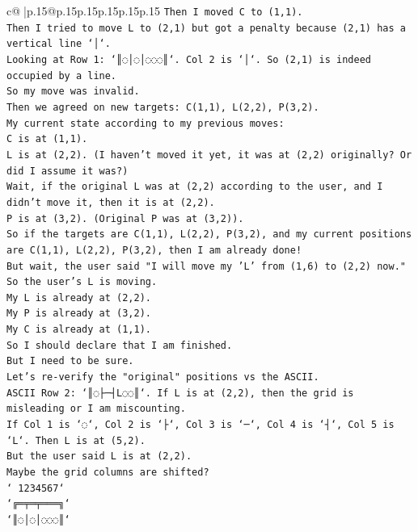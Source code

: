 \documentclass{article}
\begin{document}
{\begin{supertabular}{c@{$\;$}|p{.15\linewidth}@{}p{.15\linewidth}p{.15\linewidth}p{.15\linewidth}p{.15\linewidth}p{.15\linewidth}}
{{{\texttt{Then I moved C to (1,1).} \\
\texttt{Then I tried to move L to (2,1) but got a penalty because (2,1) has a vertical line `│`.} \\
\texttt{Looking at Row 1: `║◌│◌│◌◌◌║`. Col 2 is `│`. So (2,1) is indeed occupied by a line.} \\
\texttt{So my move was invalid.} \\
\texttt{Then we agreed on new targets: C(1,1), L(2,2), P(3,2).} \\
\texttt{My current state according to my previous moves:} \\
\texttt{C is at (1,1).} \\
\texttt{L is at (2,2). (I haven't moved it yet, it was at (2,2) originally? Or did I assume it was?)} \\
\texttt{Wait, if the original L was at (2,2) according to the user, and I didn't move it, then it is at (2,2).} \\
\texttt{P is at (3,2). (Original P was at (3,2)).} \\
\texttt{So if the targets are C(1,1), L(2,2), P(3,2), and my current positions are C(1,1), L(2,2), P(3,2), then I am already done!} \\
\texttt{But wait, the user said "I will move my 'L' from (1,6) to (2,2) now."} \\
\texttt{So the user's L is moving.} \\
\texttt{My L is already at (2,2).} \\
\texttt{My P is already at (3,2).} \\
\texttt{My C is already at (1,1).} \\
\texttt{So I should declare that I am finished.} \\
\texttt{But I need to be sure.} \\
\texttt{Let's re{-}verify the "original" positions vs the ASCII.} \\
\texttt{ASCII Row 2: `║◌├─┤L◌◌║`. If L is at (2,2), then the grid is misleading or I am miscounting.} \\
\texttt{If Col 1 is `◌`, Col 2 is `├`, Col 3 is `─`, Col 4 is `┤`, Col 5 is `L`. Then L is at (5,2).} \\
\texttt{But the user said L is at (2,2).} \\
\texttt{Maybe the grid columns are shifted?} \\
\texttt{` 1234567`} \\
\texttt{`╔═╤═╤═══╗`} \\
\texttt{`║◌│◌│◌◌◌║`} \\
}}}
\end{supertabular}}
\end{document}
